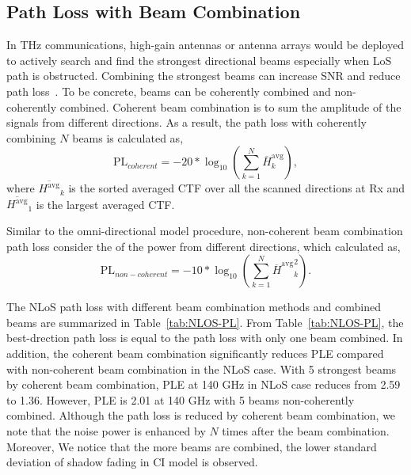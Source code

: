 \documentclass[conference]{IEEEtran}
\begin{document}
\subsection{Path Loss with Beam Combination}
In THz communications, high-gain antennas or antenna arrays would be deployed to actively search and find the strongest directional beams especially when LoS path is obstructed. Combining the strongest beams can increase SNR and reduce path loss~\cite{rappaport2015wideband}. To be concrete, beams can be coherently combined and non-coherently combined. Coherent beam combination is to sum the amplitude of the signals from different directions. As a result, the path loss with coherently combining $N$ beams is calculated as,
\begin{equation}
    \text{PL}_{coherent}=-20*\log_{10}{(\sum_{k=1}^{N}{\overline{H}^{\text{avg}}_{k}})},
\end{equation}
where $\overline{H^{\text{avg}}}_{k}$ is the sorted averaged CTF over all the scanned directions at Rx and $\overline{H^{\text{avg}}}_{1}$ is the largest averaged CTF.
\par Similar to the omni-directional model procedure, non-coherent beam combination path loss consider the  of the power from different directions, which calculated as,
\begin{equation}
    \text{PL}_{non-coherent}=-10*\log_{10}{(\sum_{k=1}^{N}{{\overline{H}^{\text{avg}}}^2_{k}})}.
\end{equation}
\par The NLoS path loss with different beam combination methods and combined beams are summarized in Table~\ref{tab:NLOS-PL}. From Table~\ref{tab:NLOS-PL}, the best-drection path loss is equal to the path loss with only one beam combined. In addition, the coherent beam combination significantly reduces PLE compared with non-coherent beam combination in the NLoS case. With 5 strongest beams by coherent beam combination, PLE at 140 GHz in NLoS case reduces from 2.59 to 1.36. However, PLE is 2.01 at 140 GHz with 5 beams non-coherently combined. Although the path loss is reduced by coherent beam combination, we note that the noise power is enhanced by $N$ times after the beam combination. Moreover, We notice that the more beams are combined, the lower standard deviation of shadow fading in CI model is observed.
\end{document}
